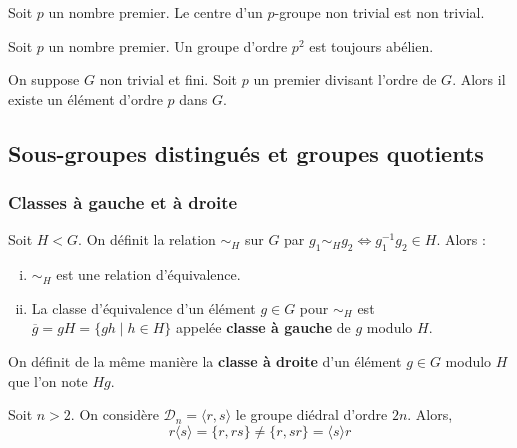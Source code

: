 	\begin{corollary}
		Soit $p$ un nombre premier. Le centre d'un $p$-groupe non trivial est non trivial.
	\end{corollary}
	
	\begin{corollary}
		Soit $p$ un nombre premier. Un groupe d'ordre $p^2$ est toujours abélien.
	\end{corollary}
	
	\begin{application}
		On suppose $G$ non trivial et fini. Soit $p$ un premier divisant l'ordre de $G$. Alors il existe un élément d'ordre $p$ dans $G$.
	\end{application}
	
	\subsection{Sous-groupes distingués et groupes quotients}
	
	\subsubsection{Classes à gauche et à droite}
	
	
	\begin{proposition}
		\label{103-1}
		Soit $H < G$. On définit la relation $\sim_H$ sur $G$ par $g_1 \sim_H g_2 \iff g_1^{-1} g_2 \in H$. Alors :
		\begin{enumerate}[(i)]
			\item $\sim_H$ est une relation d'équivalence.
			\item La classe d'équivalence d'un élément $g \in G$ pour $\sim_H$ est $\overline{g} = gH = \{ gh \mid h \in H \}$ appelée \textbf{classe à gauche} de $g$ modulo $H$.
		\end{enumerate}
	\end{proposition}
	
	\begin{remark}
		On définit de la même manière la \textbf{classe à droite} d'un élément $g \in G$ modulo $H$ que l'on note $Hg$.
	\end{remark}
	
	\begin{example}
		Soit $n > 2$. On considère $\mathcal{D}_n = \langle r, s \rangle$ le groupe diédral d'ordre $2n$. Alors,
		\[ r \langle s \rangle = \{ r, rs \} \neq \{ r, sr \} = \langle s \rangle r \]
	\end{example}
	

